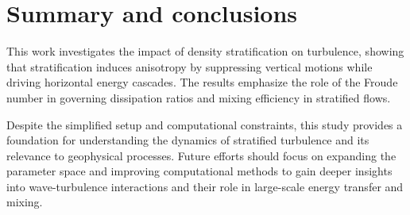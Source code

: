 \documentclass[final,5p,times,twocolumn,authoryear]{elsarticle}
\begin{document}
\section{Summary and conclusions}

This work investigates the impact of density stratification on turbulence, showing that stratification induces anisotropy by suppressing vertical motions while driving horizontal energy cascades. The results emphasize the role of the Froude number in governing dissipation ratios and mixing efficiency in stratified flows.

Despite the simplified setup and computational constraints, this study provides a foundation for understanding the dynamics of stratified turbulence and its relevance to geophysical processes. Future efforts should focus on expanding the parameter space and improving computational methods to gain deeper insights into wave-turbulence interactions and their role in large-scale energy transfer and mixing.

\qquad 

 

\end{document}
